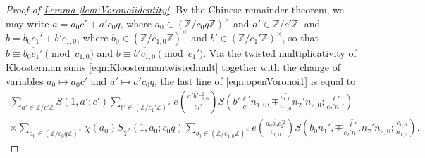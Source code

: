 \documentclass[11pt,a4paper]{amsart}
\newcommand{\Z}{\mathbb{Z}}
\numberwithin{equation}{section}
\theoremstyle{remark}
\theoremstyle{definition}
\begin{document}
\begin{proof}[Proof of {\hyperref[lem:Voronoiidentity]{Lemma \ref*{lem:Voronoiidentity}}}]
By the Chinese remainder theorem, we may write $a = a_0 c' + a' c_0 q$, where $a_0 \in (\Z/c_0 q\Z)^{\times}$ and $a' \in \Z/c'\Z$, and $b = b_0 c_1' + b' c_{1,0}$, where $b_0 \in (\Z/c_{1,0}\Z)^{\times}$ and $b' \in (\Z/c_1'\Z)^{\times}$, so that $\overline{b} \equiv \overline{b_0 c_1'} \pmod{c_{1,0}}$ and $\overline{b} \equiv \overline{b' c_{1,0}} \pmod{c_1'}$. Via the twisted multiplicativity of Kloosterman sums \eqref{eqn:Kloostermantwistedmult} together with the change of variables $a_0 \mapsto a_0 c'$ and $a' \mapsto a' c_0 q$, the last line of \eqref{eqn:openVoronoi1} is equal to
\begin{multline}
\label{eqn:twistedmult}
\sum_{a' \in \Z/c'\Z} S(1,a';c') \sum_{b' \in (\Z/c_1'\Z)^{\times}} e\left(\frac{a' \overline{b'} c_{2,0}^2}{c_1'}\right) S\left(b' \frac{\ell'}{c'} n_{1,0}, \mp \overline{\frac{c_{1,0}}{n_{1,0}}} n_2' n_{2,0}; \frac{\ell'}{c_2' n_1'}\right)	\\
\times \sum_{a_0 \in (\Z/c_0 q\Z)^{\times}} \chi(a_0) S_{\overline{\chi}^2}(1,a_0;c_0 q) \sum_{b_0 \in (\Z/c_{1,0}\Z)^{\times}} e\left(\frac{a_0 \overline{b_0} c_2^{\prime 2}}{c_{1,0}}\right) S\left(b_0 n_1', \mp \overline{\frac{\ell'}{c_2' n_1'}} n_2' n_{2,0}; \frac{c_{1,0}}{n_{1,0}}\right).
\end{multline}


\end{proof}
\end{document}
